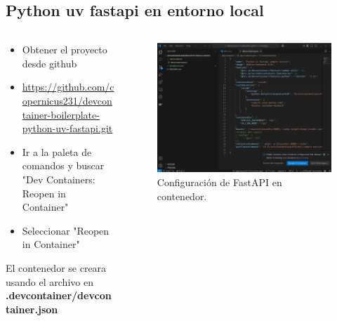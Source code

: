 \documentclass{beamer}
\begin{document}
\subsection{Python uv fastapi en entorno local}
\begin{frame}{\subsecname}
  \begin{columns}
    \begin{column}{0.7\textwidth}
      \begin{itemize}
        \small
        \item Obtener el proyecto desde github
        \item \href{https://github.com/copernicus231/devcontainer-boilerplate-python-uv-fastapi.git}{https://github.com/copernicus231/devcontainer-boilerplate-python-uv-fastapi.git}
        \item Ir a la paleta de comandos y buscar "Dev Containers: Reopen in Container"
        \item Seleccionar "Reopen in Container"
        \normalsize    \end{itemize}
      El contenedor se creara usando el archivo en \textbf{.devcontainer/devcontainer.json}
    \end{column}
    \begin{column}{0.3\textwidth}
      \begin{figure}
        \centering
        \includegraphics[width=\textwidth]{images/open-container.png}
        \caption{Configuración de FastAPI en contenedor.}
      \end{figure}
    \end{column}
  \end{columns}
\end{frame}
\end{document}

